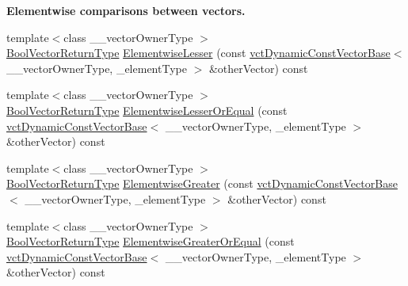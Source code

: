 \begin{Indent}{\bf Elementwise comparisons between vectors.}
\begin{DoxyCompactItemize}
\item 
{\footnotesize template$<$class \+\_\+\+\_\+vector\+Owner\+Type $>$ }\\\hyperlink{classvct_dynamic_const_vector_base_a2de5b9c0f8c70782c548808d3ae4a453}{Bool\+Vector\+Return\+Type} \hyperlink{classvct_dynamic_const_vector_base_a4a0e8e8b86bc24e798ac7a5d71436a5b}{Elementwise\+Lesser} (const \hyperlink{classvct_dynamic_const_vector_base}{vct\+Dynamic\+Const\+Vector\+Base}$<$ \+\_\+\+\_\+vector\+Owner\+Type, \+\_\+element\+Type $>$ \&other\+Vector) const 
\item 
{\footnotesize template$<$class \+\_\+\+\_\+vector\+Owner\+Type $>$ }\\\hyperlink{classvct_dynamic_const_vector_base_a2de5b9c0f8c70782c548808d3ae4a453}{Bool\+Vector\+Return\+Type} \hyperlink{classvct_dynamic_const_vector_base_aa925079679de7fb2afd65abf059ad05d}{Elementwise\+Lesser\+Or\+Equal} (const \hyperlink{classvct_dynamic_const_vector_base}{vct\+Dynamic\+Const\+Vector\+Base}$<$ \+\_\+\+\_\+vector\+Owner\+Type, \+\_\+element\+Type $>$ \&other\+Vector) const 
\item 
{\footnotesize template$<$class \+\_\+\+\_\+vector\+Owner\+Type $>$ }\\\hyperlink{classvct_dynamic_const_vector_base_a2de5b9c0f8c70782c548808d3ae4a453}{Bool\+Vector\+Return\+Type} \hyperlink{classvct_dynamic_const_vector_base_a8bed1d384abdaf783e051da23aa232f7}{Elementwise\+Greater} (const \hyperlink{classvct_dynamic_const_vector_base}{vct\+Dynamic\+Const\+Vector\+Base}$<$ \+\_\+\+\_\+vector\+Owner\+Type, \+\_\+element\+Type $>$ \&other\+Vector) const 
\item 
{\footnotesize template$<$class \+\_\+\+\_\+vector\+Owner\+Type $>$ }\\\hyperlink{classvct_dynamic_const_vector_base_a2de5b9c0f8c70782c548808d3ae4a453}{Bool\+Vector\+Return\+Type} \hyperlink{classvct_dynamic_const_vector_base_ac9333c47b0e899552b71c3d16080b99b}{Elementwise\+Greater\+Or\+Equal} (const \hyperlink{classvct_dynamic_const_vector_base}{vct\+Dynamic\+Const\+Vector\+Base}$<$ \+\_\+\+\_\+vector\+Owner\+Type, \+\_\+element\+Type $>$ \&other\+Vector) const 
\end{DoxyCompactItemize}
\end{Indent}
